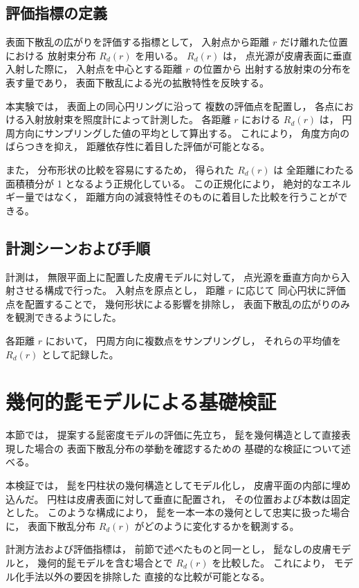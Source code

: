 \subsection{評価指標の定義}
\label{sec:rd_definition}
表面下散乱の広がりを評価する指標として，
入射点から距離 $r$ だけ離れた位置における
放射束分布 $R_d(r)$ を用いる。
$R_d(r)$ は，
点光源が皮膚表面に垂直入射した際に，
入射点を中心とする距離 $r$ の位置から
出射する放射束の分布を表す量であり，
表面下散乱による光の拡散特性を反映する。

本実験では，
表面上の同心円リングに沿って
複数の評価点を配置し，
各点における入射放射束を照度計によって計測した。
各距離 $r$ における $R_d(r)$ は，
円周方向にサンプリングした値の平均として算出する。
これにより，
角度方向のばらつきを抑え，
距離依存性に着目した評価が可能となる。

また，
分布形状の比較を容易にするため，
得られた $R_d(r)$ は
全距離にわたる面積積分が 1 となるよう正規化している。
この正規化により，
絶対的なエネルギー量ではなく，
距離方向の減衰特性そのものに着目した比較を行うことができる。

\subsection{計測シーンおよび手順}
\label{sec:rd_procedure}
計測は，
無限平面上に配置した皮膚モデルに対して，
点光源を垂直方向から入射させる構成で行った。
入射点を原点とし，
距離 $r$ に応じて
同心円状に評価点を配置することで，
幾何形状による影響を排除し，
表面下散乱の広がりのみを観測できるようにした。

各距離 $r$ において，
円周方向に複数点をサンプリングし，
それらの平均値を $R_d(r)$ として記録した。



\section{幾何的髭モデルによる基礎検証}
\label{sec:geom_beard}
本節では，
提案する髭密度モデルの評価に先立ち，
髭を幾何構造として直接表現した場合の
表面下散乱分布の挙動を確認するための
基礎的な検証について述べる。

本検証では，
髭を円柱状の幾何構造としてモデル化し，
皮膚平面の内部に埋め込んだ。
円柱は皮膚表面に対して垂直に配置され，
その位置および本数は固定とした。
このような構成により，
髭を一本一本の幾何として忠実に扱った場合に，
表面下散乱分布 $R_d(r)$ がどのように変化するかを観測する。

計測方法および評価指標は，
前節で述べたものと同一とし，
髭なしの皮膚モデルと，
幾何的髭モデルを含む場合とで
$R_d(r)$ を比較した。
これにより，
モデル化手法以外の要因を排除した
直接的な比較が可能となる。



